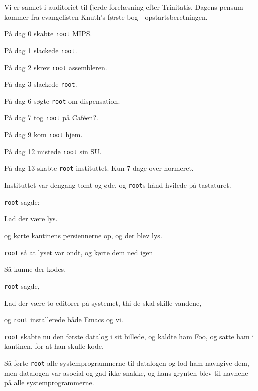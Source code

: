 \documentclass[a4paper,11pt]{article}
\begin{document}
\begin{sketch}

   Vi er samlet i auditoriet til fjerde forelæsning efter Trinitatis.
   Dagens pensum kommer fra evangelisten Knuth's første bog - opstartsberetningen.
  
   På dag 0 skabte \texttt{root} MIPS.

   På dag 1 slackede \texttt{root}.

   På dag 2 skrev \texttt{root} assembleren.

   På dag 3 slackede \texttt{root}.

   På dag 6 søgte \texttt{root} om dispensation.

   På dag 7 tog \texttt{root} på Caféen?.

   På dag 9 kom \texttt{root} hjem.

   På dag 12 mistede \texttt{root} sin SU.

   På dag 13 skabte \texttt{root} instituttet.  Kun 7 dage over normeret.

   Instituttet var dengang tomt og øde, og \texttt{root}s hånd
  hvilede på tastaturet.

   \texttt{root} sagde:

   Lad der være lys.

   og kørte kantinens persiennerne op, og der blev lys.


   \texttt{root} så at lyset var ondt, og kørte dem ned igen


   Så kunne der kodes.
  
   \texttt{root} sagde,

   Lad der være to editorer på systemet, thi de skal skille
  vandene,

   og \texttt{root} installerede både Emacs og vi.
  
   \texttt{root} skabte nu den første datalog i sit billede, og
  kaldte ham Foo, og satte ham i kantinen, for at han skulle kode.
  

   Så førte \texttt{root} alle systemprogrammerne til
  datalogen og lod ham navngive dem, men datalogen var asocial og gad
  ikke snakke, og hans grynten blev til navnene på alle
  systemprogrammerne.


\end{sketch}
\end{document}
